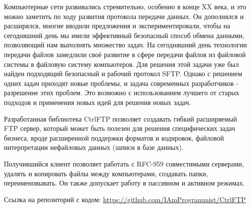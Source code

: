 \documentclass[a4paper,14pt]{extarticle}
\begin{document}
Компьютерные сети развивались стремительно, особенно в конце XX века, и это можно заметить по ходу
развития протокола передачи данных. Он дополнялся и расширялся, многие вводили предложения 
и экспериментировали, чтобы на сегодняшний день мы имели эффективный безопасный способ
обмена данными, позволяющий нам выполнять множество задач. На сегодняшний день 
технологии передачи файлов замедлили своё развитие в сфере
передачи файлов из файловой системы в файловую систему компьютеров. 
Для решения этой задачи уже был найден подходящий безопасный и рабочий протокол SFTP.
Однако с решением одних задач приходят новые проблемы, и задача современных разработчиков - 
разрешение этих проблем. Это возможно с использованием лучшего от старых подходов
и применения новых идей для решения новых задач.

Разработанная библиотека CtrlFTP позволяет создавать гибкий расширяемый FTP 
сервер, который может быть полезен для решения специфических задач бизнеса, 
вроде расширенной поддержки форматов и кодировок, файловой интерпретации 
нефайловых данных (записи в базе данных). 

Получившийся клиент позволяет работать с RFC-959 совместимыми серверами, удалять
и копировать файлы между компьютерами, создавать папки, переименовывать. Он также
допускает работу в пассивном и активном режимах.

Ссылка на репозиторий с кодом: \href{https://github.com/IAmProgrammist/CtrlFTP}{https://github.com/IAmProgrammist/CtrlFTP}

\newpage
\end{document}
